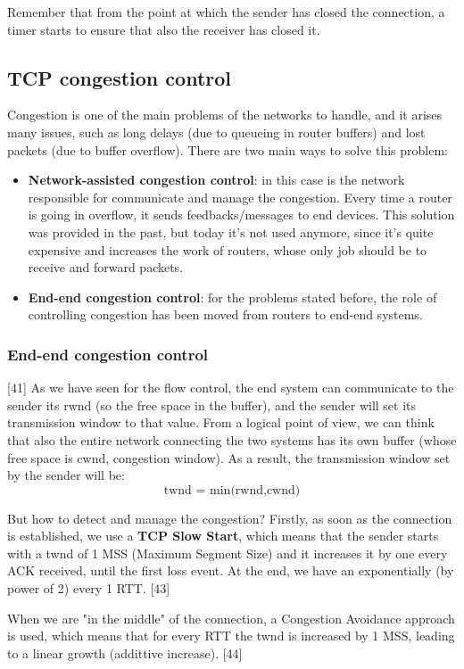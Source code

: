 \noindent Remember that from the point at which the sender has closed the connection, a timer starts to ensure that also the receiver has closed it.

\subsection{TCP congestion control}
Congestion is one of the main problems of the networks to handle, and it arises many issues, such as long delays (due to queueing in router buffers) and lost packets (due to buffer overflow). There are two main ways to solve this problem:
\begin{itemize}
    \item \textbf{Network-assisted congestion control}: in this case is the network responsible for communicate and manage the congestion. Every time a router is going in overflow, it sends feedbacks/messages to end devices. This solution was provided in the past, but today it's not used anymore, since it's quite expensive and increases the work of routers, whose only job should be to receive and forward packets.
    \item \textbf{End-end congestion control}: for the problems stated before, the role of controlling congestion has been moved from routers to end-end systems.
\end{itemize}

\subsubsection{End-end congestion control}
[41] As we have seen for the flow control, the end system can communicate to the sender its rwnd (so the free space in the buffer), and the sender will set its transmission window to that value. From a logical point of view, we can think that also the entire network connecting the two systems has its own buffer (whose free space is cwnd, congestion window). As a result, the transmission window set by the sender will be:
\[\text{twnd = min(rwnd,cwnd)}\]

\noindent But how to detect and manage the congestion?
Firstly, as soon as the connection is established, we use a \textbf{TCP Slow Start}, which means that the sender starts with a twnd of 1 MSS (Maximum Segment Size) and it increases it by one every ACK received, until the first loss event. At the end, we have an exponentially (by power of 2) every 1 RTT. [43]

When we are "in the middle" of the connection, a Congestion Avoidance approach is used, which means that for every RTT the twnd is increased by 1 MSS, leading to a linear growth (addittive increase). [44]

